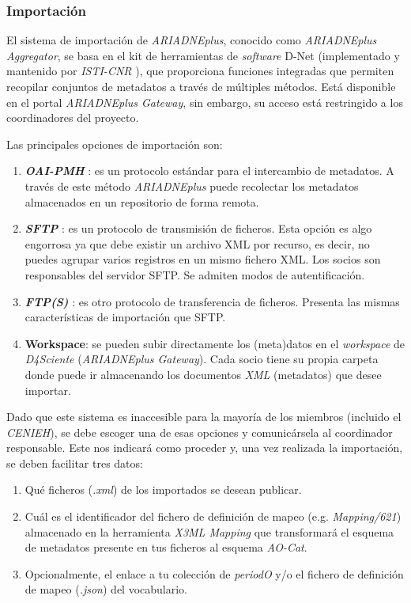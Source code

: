 \subsubsection{Importación}

El sistema de importación de \emph{ARIADNEplus}, conocido como \emph{ARIADNEplus}
\emph{Aggregator}, se basa en el kit de herramientas de \emph{software}
D-Net (implementado y mantenido por \emph{ISTI-CNR} \cite{isti:web}), 
que proporciona funciones integradas que permiten recopilar conjuntos 
de metadatos a través de múltiples métodos. Está disponible en el portal 
\emph{ARIADNEplus Gateway}, sin embargo, su acceso está restringido a los 
coordinadores del proyecto. 

Las principales opciones de importación son:

\begin{enumerate}
\def\labelenumi{\arabic{enumi}.}
\tightlist
\item
  \textbf{\emph{OAI-PMH}} \cite{oai:web}: es un protocolo estándar para el intercambio de
  metadatos. A través de este método \emph{ARIADNEplus} puede recolectar los
  metadatos almacenados en un repositorio de forma remota.
\item
  \textbf{\emph{SFTP}} \cite{wiki:sftp} : es un protocolo de transmisión de ficheros. Esta opción
  es algo engorrosa ya que debe existir un archivo XML por recurso, es
  decir, no puedes agrupar varios registros en un mismo fichero XML. Los
  socios son responsables del servidor SFTP. Se admiten modos de
  autentificación.
\item
  \textbf{\emph{FTP(S)}} \cite{wiki:ftp}: es otro protocolo de transferencia de ficheros.
  Presenta las mismas características de importación que SFTP.
\item
  \textbf{Workspace}: se pueden subir directamente los (meta)datos en el
  \emph{workspace} de \emph{D4Sciente} (\emph{ARIADNEplus Gateway}). Cada socio tiene
  su propia carpeta donde puede ir almacenando los documentos \emph{XML}
  (metadatos) que desee importar.
\end{enumerate}

Dado que este sistema es inaccesible para la mayoría de los miembros
(incluido el \emph{CENIEH}), se debe escoger una de esas opciones y
comunicársela al coordinador responsable. Este nos indicará como proceder y,
una vez realizada la importación, se deben facilitar tres datos:

\begin{enumerate}
\tightlist
\item
  Qué ficheros (\emph{.xml}) de los importados se desean publicar.
\item
  Cuál es el identificador del fichero de definición de mapeo (e.g.
  \emph{Mapping/621}) almacenado en la herramienta \emph{X3ML Mapping} que 
  transformará el esquema de metadatos presente en tus ficheros al esquema \emph{AO-Cat}.
\item
  Opcionalmente, el enlace a tu colección de \emph{periodO} y/o el fichero de definición de
  mapeo (\emph{.json}) del vocabulario.
\end{enumerate}

